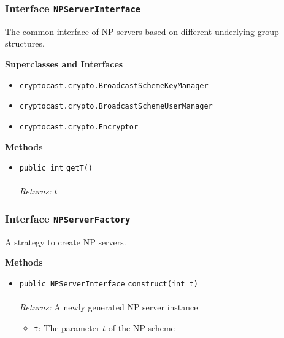 \subsubsection{Interface \lstinline|NPServerInterface|}
The common interface of NP servers based on different underlying group
 structures. \\
\noindent\begin{minipage}[t]{5cm}
\vspace{0.3em}
\hspace*{2em}
\vspace{0.3em}
\end{minipage}



\textbf{\sffamily Superclasses and Interfaces}
\begin{itemize}
\item \lstinline|cryptocast.crypto.BroadcastSchemeKeyManager|
\item \lstinline|cryptocast.crypto.BroadcastSchemeUserManager|
\item \lstinline|cryptocast.crypto.Encryptor|
\end{itemize}



\textbf{\sffamily Methods}
\begin{itemize}
\item \lstinline|public int| \lstinline|getT|\lstinline|()|\\ \\[-0.6em]
\emph{Returns:} $t$



\end{itemize}

\subsubsection{Interface \lstinline|NPServerFactory|}
A strategy to create NP servers. \\
\noindent\begin{minipage}[t]{5cm}
\vspace{0.3em}
\hspace*{2em}
\vspace{0.3em}
\end{minipage}





\textbf{\sffamily Methods}
\begin{itemize}
\item \lstinline|public NPServerInterface| \lstinline|construct|\lstinline|(int t)|\\ \\[-0.6em]
\emph{Returns:} A newly generated NP server instance
\begin{itemize}
\item \lstinline|t|: The parameter $t$ of the NP scheme
\end{itemize}



\end{itemize}


